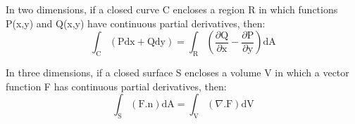 In two dimensions, if a closed curve C encloses a region R in which functions
P(x,y) and Q(x,y) have continuous partial derivatives, then:
\[ \int_{\mathrm{C}} ( \mathrm{Pdx + Qdy} ) = \int_{\mathrm{R}} \left ( \frac{\partial \mathrm{Q}}{\partial \mathrm{x}}
- \frac{\partial \mathrm{P}}{\partial \mathrm{y}} \right ) \mathrm{dA} \]
\par
In three dimensions, if a closed surface S encloses a volume V in which a vector
function F has continuous partial derivatives, then:
\[ \int_{\mathrm{S}} ( \mathrm{F.n} ) \mathrm{dA} = \int_{\mathrm{V}} ( \nabla \mathrm{.F} ) \mathrm{dV} \]